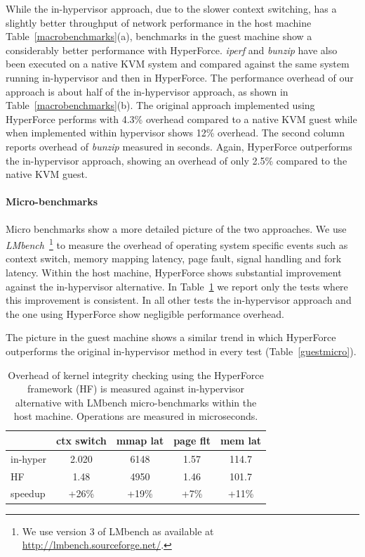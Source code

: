 While the in-hypervisor approach, due to the slower context switching, has a slightly better throughput of network performance in the host machine
Table~\ref{macrobenchmarks}(a), benchmarks in the guest machine show a considerably better performance with HyperForce.   
\emph{iperf} and \emph{bunzip} have also been executed on a native KVM system and compared against the same system running in-hypervisor and then in HyperForce. 
The performance overhead of our approach is about half of the in-hypervisor approach, as shown in Table~\ref{macrobenchmarks}(b). The original approach implemented using HyperForce performs with 4.3\% overhead compared to a native KVM guest while when implemented within hypervisor shows 12\% overhead.
The second column reports overhead of \textit{bunzip} measured in seconds. Again, HyperForce outperforms the in-hypervisor approach, showing an overhead of only 2.5\% compared to the native KVM guest.
  

\paragraph{Micro-benchmarks} \label{microbench}
Micro benchmarks show a more detailed picture of the two approaches. 
We use \emph{LMbench}~\cite{lmbench-paper}\footnote{We use version 3 of
LMbench as available at \url{http://lmbench.sourceforge.net/}.} to measure the overhead of operating system specific events such as context switch, memory mapping latency, page fault, signal handling and fork latency.
Within the host machine, HyperForce shows substantial improvement against the in-hypervisor alternative. 
In Table~\ref{hostmicro} we report only the tests where this improvement is consistent. In all other tests the in-hypervisor approach and the one using HyperForce show negligible performance overhead. 

The picture in the guest machine shows a similar trend in which HyperForce outperforms the original in-hypervisor method in every test (Table~\ref{guestmicro}).


\begin{table}[htdp]
\begin{center}
\begin{tabular}{| l | c | c | c | c | }
\hline
~ & ctx switch  & mmap lat  & page flt 	 & mem lat \\
\hline
in-hyper     & 2.020  &	6148	&	1.57		&114.7  \\
HF		& 1.48    &	4950	&	1.46		& 101.7 \\
\hline
speedup         &+26\% & +19\% & +7\% & +11\% \\
\hline
\end{tabular}
\caption{Overhead of kernel integrity checking using the HyperForce framework (HF) is measured against in-hypervisor alternative with LMbench micro-benchmarks within the host machine. Operations are measured in microseconds.}
\vspace{0.3cm}
\end{center}
\label{hostmicro}
\end{table}%

